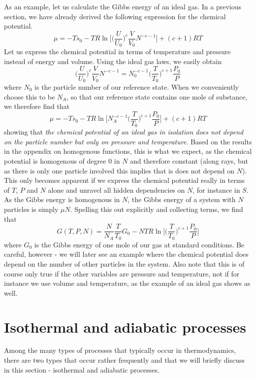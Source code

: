 \documentclass[a4paper, draft]{article}
\theoremstyle{own}
\theoremstyle{remark}
\begin{document}
As an example, let us calculate the Gibbs energy of an ideal gas. In a previous section, we have already derived the following expression for the chemical potential.
$$
\mu  = -T s_0 - T R \ln \big[ \big( \frac{U}{U_0} \big)^c \frac{V}{V_0} N^{-c - 1}  \big] + (c+1) RT 
$$
Let us express the chemical potential in terms of temperature and pressure instead of energy and volume. Using the ideal gas laws, we easily obtain
$$
\big( \frac{U}{U_0} \big)^c \frac{V}{V_0} N^{-c - 1} = N_0^{-c - 1} \big( \frac{T}{T_0} \big)^{c+1} \frac{P_0}{P}
$$
where $N_0$ is the particle number of our reference state. When we conveniently choose this to be $N_A$, so that our reference state contains one mole of substance, we therefore find that
$$
\mu  = -T s_0 - T R \ln \big[ N_A^{-c - 1} \big( \frac{T}{T_0} \big)^{c+1} \frac{P_0}{P}  \big] + (c+1) RT
$$
showing that {\em the chemical potential of an ideal gas in isolation does not depend on the particle number but only on pressure and temperature}. Based on the results in the appendix on homogenous functions, this is what we expect, as the chemical potential is homogenous of degree $0$ in $N$ and therefore constant (along rays, but as there is only one particle involved this implies that is does not depend on $N$). This only becomes apparent if we express the chemical potential really in terms of $T$, $P$ and $N$ alone and unravel all hidden dependencies on $N$, for instance in $S$.  As the Gibbs energy is homogenous in $N$,  the Gibbs energy of a system with $N$ particles is simply $\mu N$. Spelling this out explicitly and collecting terms, we find that
$$
G(T, P, N) = \frac{N}{N_A} \frac{T}{T_0} G_0 - N T R  \ln \big[ \big( \frac{T}{T_0} \big)^{c+1} \frac{P_0}{P}  \big]
$$
where $G_0$ is the Gibbs energy of one mole of our gas at standard conditions. Be careful, however - we will later see an example where the chemical potential does depend on the number of other particles in the system. Also note that this is of course only true if the other variables are pressure and temperature, not if for instance we use volume and temperature, as the example of an ideal gas shows as well.

\section{Isothermal and adiabatic processes}

Among the many types of processes that typically occur in thermodynamics, there are two types that occur rather frequently and that we will briefly discuss in this section - isothermal and adiabatic processes.
\end{document}
